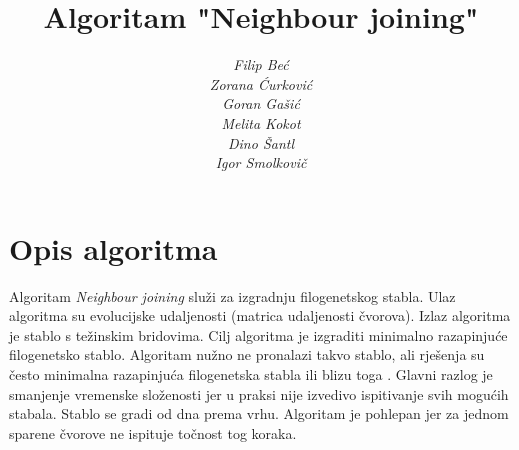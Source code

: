 \documentclass[times, utf8, seminar, numeric]{fer}
\begin{document}
\nocite{saitou}\nocite{phylpro}\nocite{wiki}\nocite{mbt}

\title{Algoritam "Neighbour joining"}

\author{\itshape{Filip Beć}\\
				 \itshape{Zorana Ćurković}\\
				 \itshape{Goran Gašić}\\
				 \itshape{Melita Kokot}\\
				 \itshape{Dino Šantl}\\
				 \itshape{Igor Smolkovič}
				 }


\maketitle

\tableofcontents

\chapter{Opis algoritma}

Algoritam \emph{Neighbour joining} služi za izgradnju filogenetskog stabla. Ulaz algoritma su evolucijske udaljenosti (matrica udaljenosti čvorova). Izlaz algoritma je stablo s težinskim bridovima. Cilj algoritma je izgraditi minimalno razapinjuće filogenetsko stablo. Algoritam nužno ne pronalazi takvo stablo, ali rješenja su često minimalna razapinjuća filogenetska stabla ili blizu toga \cite{saitou}. Glavni razlog je smanjenje vremenske složenosti jer u praksi nije izvedivo ispitivanje svih mogućih stabala. Stablo se gradi od dna prema vrhu. Algoritam je pohlepan jer za jednom sparene čvorove ne ispituje točnost tog koraka.
\end{document}

